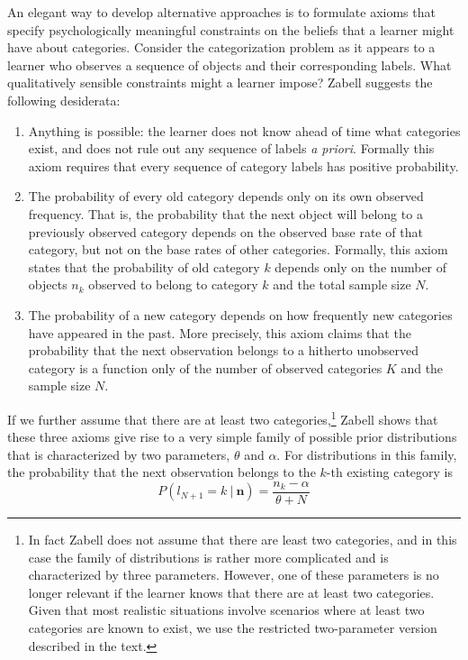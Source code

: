 \documentclass[doc]{apa6}
\newcommand{\given}{\ | \ }
\begin{document}
An elegant way to develop alternative approaches is to formulate axioms that specify psychologically meaningful constraints on the beliefs that a learner might have about categories. Consider the categorization problem as it appears to a learner who observes a sequence of objects and their corresponding labels. What qualitatively sensible constraints might a learner impose? Zabell \citeyear{zabell_carnap_2011} suggests the following desiderata:
\bigskip
\begin{enumerate}[label={(\arabic*)}]
\item Anything is possible: the learner does not know ahead of time what categories exist, and does not rule out any sequence of labels {\it a priori}. Formally this axiom requires that every sequence of category labels has positive probability. \smallskip
\item The probability of every old category depends only on its own observed frequency. That is, the probability that the next object will belong to a previously observed category depends on the observed base rate of that category, but not on the base rates of other categories. Formally, this axiom states that the probability of old category $k$ depends only on the number of objects $n_k$ observed to belong to category $k$ and the total sample size $N$.\smallskip
\item The probability of a new category depends on how frequently new categories have appeared in the past. More precisely, this axiom claims that the probability that the next observation belongs to a hitherto unobserved category is a function only of the number of observed categories $K$ and the sample size $N$.
\end{enumerate} \bigskip
If we further assume that there are at least two categories,\footnote{In fact Zabell does not assume that there are least two categories, and in this case the family of distributions is rather more complicated and is characterized by three parameters. However, one of these parameters is no longer relevant if the learner knows that there are at least two categories. Given that most realistic situations involve scenarios where at least two categories are known to exist, we use the restricted two-parameter version described in the text.} Zabell shows that these three axioms give rise to a very simple family of possible prior distributions that is characterized by two parameters,
$\theta$ and $\alpha$. For distributions in this family, the probability that the next observation belongs to the $k$-th existing category is
\begin{equation}
\label{eq:gcrpold}
P(l_{N+1} = k \given \bm{n}) = \frac{n_k - \alpha}{\theta + N}
\end{equation}
\end{document}

